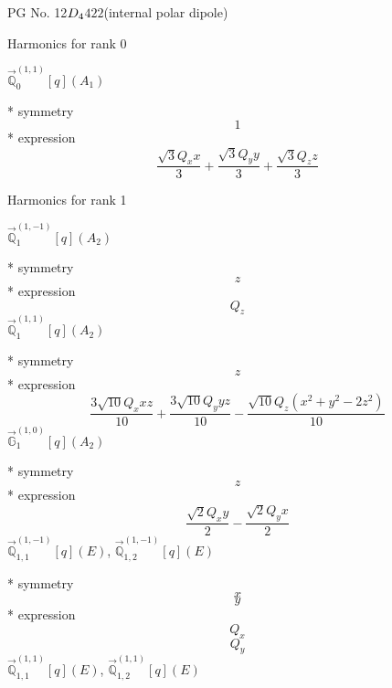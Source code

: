 \documentclass[fleqn,8pt]{jsarticle}
\begin{document}
\setcounter{MaxMatrixCols}{32}

\renewcommand{\tablename}{Table~}
\renewcommand{\figurename}{Figure~}
\begin{center}
\LARGE
PG No. 12\quad$D_{\rm 4}$\quad$422$\quad[ tetragonal ] (internal polar dipole)
\end{center}

\noindent * Harmonics for rank 0

\noindent\quad $\vec{\mathbb{Q}}_{0}^{(1,1)}[q](A_{1})$

\noindent\quad ** symmetry
\begin{dmath*}
1
\end{dmath*}
\noindent\quad ** expression
\begin{dmath*}
\frac{\sqrt{3} Q_{x} x}{3} + \frac{\sqrt{3} Q_{y} y}{3} + \frac{\sqrt{3} Q_{z} z}{3}
\end{dmath*}

\noindent * Harmonics for rank 1

\noindent\quad $\vec{\mathbb{Q}}_{1}^{(1,-1)}[q](A_{2})$

\noindent\quad ** symmetry
\begin{dmath*}
z
\end{dmath*}
\noindent\quad ** expression
\begin{dmath*}
Q_{z}
\end{dmath*}
\noindent\quad $\vec{\mathbb{Q}}_{1}^{(1,1)}[q](A_{2})$

\noindent\quad ** symmetry
\begin{dmath*}
z
\end{dmath*}
\noindent\quad ** expression
\begin{dmath*}
\frac{3 \sqrt{10} Q_{x} x z}{10} + \frac{3 \sqrt{10} Q_{y} y z}{10} - \frac{\sqrt{10} Q_{z} \left(x^{2} + y^{2} - 2 z^{2}\right)}{10}
\end{dmath*}
\noindent\quad $\vec{\mathbb{G}}_{1}^{(1,0)}[q](A_{2})$

\noindent\quad ** symmetry
\begin{dmath*}
z
\end{dmath*}
\noindent\quad ** expression
\begin{dmath*}
\frac{\sqrt{2} Q_{x} y}{2} - \frac{\sqrt{2} Q_{y} x}{2}
\end{dmath*}
\noindent\quad $\vec{\mathbb{Q}}_{1,1}^{(1,-1)}[q](E)$, $\vec{\mathbb{Q}}_{1,2}^{(1,-1)}[q](E)$

\noindent\quad ** symmetry
\begin{dmath*}
x
\end{dmath*}
\begin{dmath*}
y
\end{dmath*}
\noindent\quad ** expression
\begin{dmath*}
Q_{x}
\end{dmath*}
\begin{dmath*}
Q_{y}
\end{dmath*}
\noindent\quad $\vec{\mathbb{Q}}_{1,1}^{(1,1)}[q](E)$, $\vec{\mathbb{Q}}_{1,2}^{(1,1)}[q](E)$
\end{document}
